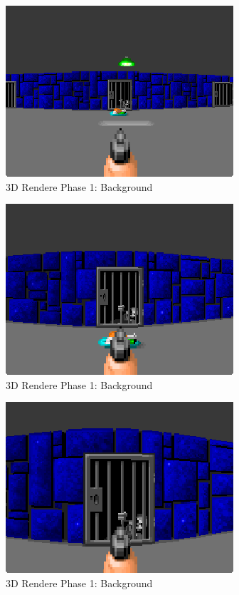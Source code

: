 \documentclass[book.tex]{subfiles}
\begin{document}
\begin{figure}[H]
\centering
 \includegraphics[scale=1.3]{imgs/fish_eye/bad_mild.png}
 \caption{3D Rendere Phase 1: Background} \label{fig:mips}
 \end{figure}
 
\begin{figure}[H]
\centering
 \includegraphics[scale=1.3]{imgs/fish_eye/bad_ok.png}
 \caption{3D Rendere Phase 1: Background} \label{fig:mips}
 \end{figure}
 
 \begin{figure}[H]
\centering
 \includegraphics[scale=1.3]{imgs/fish_eye/bad_bad.png}
 \caption{3D Rendere Phase 1: Background} \label{fig:mips}
 \end{figure}
\end{document}
